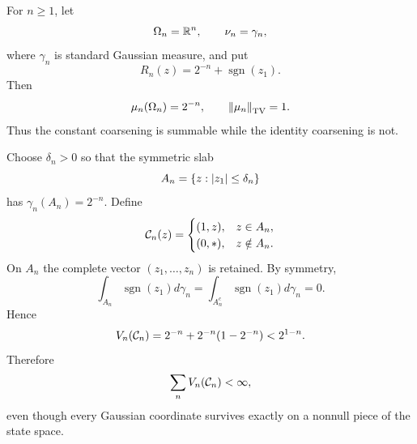 \begin{example}
\label{ex:full-gaussian-small-piece}
For $n\geq1$, let
\begin{equation*}
  \Omega_n=\mathbb R^n,
  \qquad
  \nu_n=\gamma_n,
\end{equation*}
where $\gamma_n$ is standard Gaussian measure, and put
\begin{equation*}
  R_n(z)
  =
  2^{-n}+\operatorname{sgn}(z_1).
\end{equation*}
Then
\begin{equation*}
  \mu_n(\Omega_n)=2^{-n},
  \qquad
  \left\lVert\mu_n\right\rVert_{\mathrm{TV}}=1.
\end{equation*}
Thus the constant coarsening is summable while the identity coarsening is not.

Choose $\delta_n>0$ so that the symmetric slab
\begin{equation*}
  A_n
  =
  \left\{z:\left|z_1\right|\leq\delta_n\right\}
\end{equation*}
has $\gamma_n(A_n)=2^{-n}$. Define
\begin{equation*}
  \mathcal C_n(z)
  =
  \begin{cases}
    (1,z),&z\in A_n,\\
    (0,*),&z\notin A_n.
  \end{cases}
\end{equation*}
On $A_n$ the complete vector $(z_1,\ldots,z_n)$ is retained. By symmetry,
\begin{equation*}
  \int_{A_n}\operatorname{sgn}(z_1)d\gamma_n
  =
  \int_{A_n^c}\operatorname{sgn}(z_1)d\gamma_n
  =0.
\end{equation*}
Hence
\begin{equation}
  V_n(\mathcal C_n)
  =
  2^{-n}
  +
  2^{-n}(1-2^{-n})
  <
  2^{1-n}.
  \label{eq:gaussian-small-piece-TV}
\end{equation}
Therefore
\begin{equation*}
  \sum_nV_n(\mathcal C_n)<\infty,
\end{equation*}
even though every Gaussian coordinate survives exactly on a nonnull piece of the state space.
\end{example}

